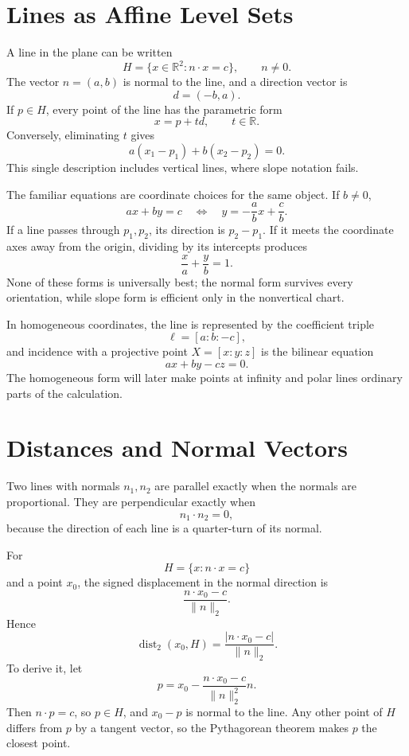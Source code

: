
\section{Lines as Affine Level Sets}

A line in the plane can be written
\[
  H=\{x\in\mathbb R^2:n\cdot x=c\},
  \qquad n\ne0.
\]
The vector \(n=(a,b)\) is normal to the line, and a direction vector is
\[
  d=(-b,a).
\]
If \(p\in H\), every point of the line has the parametric form
\[
  x=p+td,
  \qquad t\in\mathbb R.
\]
Conversely, eliminating \(t\) gives
\[
  a(x_1-p_1)+b(x_2-p_2)=0.
\]
This single description includes vertical lines, where slope notation fails.

The familiar equations are coordinate choices for the same object.  If \(b\ne0\),
\[
  ax+by=c
  \quad\Longleftrightarrow\quad
  y=-\frac abx+\frac cb.
\]
If a line passes through \(p_1,p_2\), its direction is \(p_2-p_1\).  If it meets the coordinate axes away from the origin, dividing by its intercepts produces
\[
  \frac xa+\frac yb=1.
\]
None of these forms is universally best; the normal form survives every orientation, while slope form is efficient only in the nonvertical chart.

In homogeneous coordinates, the line is represented by the coefficient triple
\[
  \ell=[a:b:-c],
\]
and incidence with a projective point \(X=[x:y:z]\) is the bilinear equation
\[
  ax+by-cz=0.
\]
The homogeneous form will later make points at infinity and polar lines ordinary parts of the calculation.

\section{Distances and Normal Vectors}

Two lines with normals \(n_1,n_2\) are parallel exactly when the normals are proportional.  They are perpendicular exactly when
\[
  n_1\cdot n_2=0,
\]
because the direction of each line is a quarter-turn of its normal.

For
\[
  H=\{x:n\cdot x=c\}
\]
and a point \(x_0\), the signed displacement in the normal direction is
\[
  \frac{n\cdot x_0-c}{\|n\|_2}.
\]
Hence
\[
  \boxed{
  \operatorname{dist}_2(x_0,H)
  =\frac{|n\cdot x_0-c|}{\|n\|_2}.}
\]
To derive it, let
\[
  p=x_0-\frac{n\cdot x_0-c}{\|n\|_2^2}n.
\]
Then \(n\cdot p=c\), so \(p\in H\), and \(x_0-p\) is normal to the line.  Any other point of \(H\) differs from \(p\) by a tangent vector, so the Pythagorean theorem makes \(p\) the closest point.

